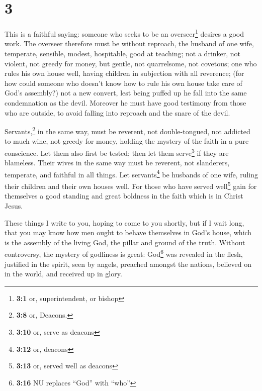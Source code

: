 \hypertarget{section-2}{%
\section{3}\label{section-2}}

 This is a faithful saying: someone who seeks to be an
overseer\footnote{\textbf{3:1} or, superintendent, or bishop} desires a
good work.  The overseer therefore must be without
reproach, the husband of one wife, temperate, sensible, modest,
hospitable, good at teaching;  not a drinker, not violent,
not greedy for money, but gentle, not quarrelsome, not covetous;
 one who rules his own house well, having children in
subjection with all reverence;  (for how could someone who
doesn't know how to rule his own house take care of God's assembly?)
 not a new convert, lest being puffed up he fall into the
same condemnation as the devil.  Moreover he must have
good testimony from those who are outside, to avoid falling into
reproach and the snare of the devil.

 Servants,\footnote{\textbf{3:8} or, Deacons.} in the same
way, must be reverent, not double-tongued, not addicted to much wine,
not greedy for money,  holding the mystery of the faith in
a pure conscience.  Let them also first be tested; then
let them serve\footnote{\textbf{3:10} or, serve as deacons} if they are
blameless.  Their wives in the same way must be reverent,
not slanderers, temperate, and faithful in all things. 
Let servants\footnote{\textbf{3:12} or, deacons} be husbands of one
wife, ruling their children and their own houses well. 
For those who have served well\footnote{\textbf{3:13} or, served well as
  deacons} gain for themselves a good standing and great boldness in the
faith which is in Christ Jesus.

 These things I write to you, hoping to come to you
shortly,  but if I wait long, that you may know how men
ought to behave themselves in God's house, which is the assembly of the
living God, the pillar and ground of the truth.  Without
controversy, the mystery of godliness is great: God\footnote{\textbf{3:16}
  NU replaces ``God'' with ``who''} was revealed in the flesh, justified
in the spirit, seen by angels, preached amongst the nations, believed on
in the world, and received up in glory.

